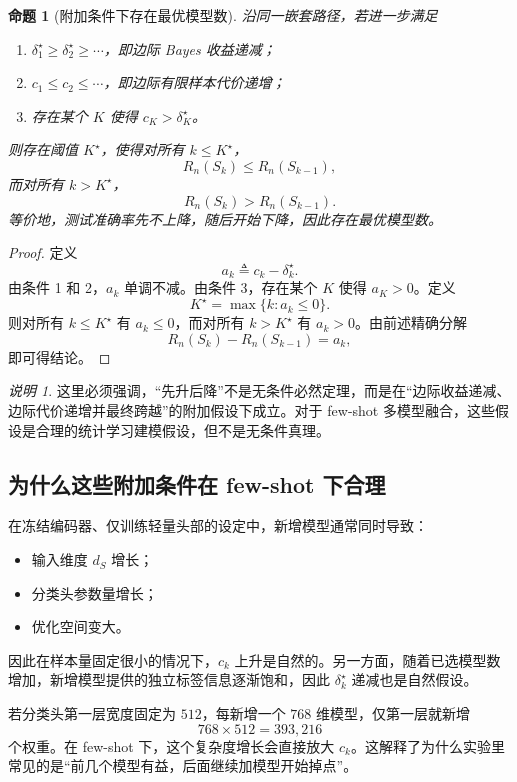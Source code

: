 \documentclass[UTF8,fontset=fandol]{ctexart}
\newtheorem{proposition}{命题}
\theoremstyle{remark}
\newtheorem{remark}{说明}
\begin{document}
\begin{proposition}[附加条件下存在最优模型数]
沿同一嵌套路径，若进一步满足
\begin{enumerate}
    \item $\delta_1^\star \ge \delta_2^\star \ge \cdots$，即边际 Bayes 收益递减；
    \item $c_1 \le c_2 \le \cdots$，即边际有限样本代价递增；
    \item 存在某个 $K$ 使得 $c_K > \delta_K^\star$。
\end{enumerate}
则存在阈值 $K^\star$，使得对所有 $k \le K^\star$，
\[
R_n(S_k) \le R_n(S_{k-1}),
\]
而对所有 $k > K^\star$，
\[
R_n(S_k) > R_n(S_{k-1}).
\]
等价地，测试准确率先不上降，随后开始下降，因此存在最优模型数。
\end{proposition}

\begin{proof}
定义
\[
a_k \triangleq c_k - \delta_k^\star.
\]
由条件 1 和 2，$a_k$ 单调不减。由条件 3，存在某个 $K$ 使得 $a_K > 0$。定义
\[
K^\star = \max \{k : a_k \le 0\}.
\]
则对所有 $k \le K^\star$ 有 $a_k \le 0$，而对所有 $k > K^\star$ 有 $a_k > 0$。由前述精确分解
\[
R_n(S_k) - R_n(S_{k-1}) = a_k,
\]
即可得结论。
\end{proof}

\begin{remark}
这里必须强调，“先升后降”不是无条件必然定理，而是在“边际收益递减、边际代价递增并最终跨越”的附加假设下成立。对于 few-shot 多模型融合，这些假设是合理的统计学习建模假设，但不是无条件真理。
\end{remark}

\subsection{为什么这些附加条件在 few-shot 下合理}

在冻结编码器、仅训练轻量头部的设定中，新增模型通常同时导致：
\begin{itemize}
    \item 输入维度 $d_S$ 增长；
    \item 分类头参数量增长；
    \item 优化空间变大。
\end{itemize}
因此在样本量固定很小的情况下，$c_k$ 上升是自然的。另一方面，随着已选模型数增加，新增模型提供的独立标签信息逐渐饱和，因此 $\delta_k^\star$ 递减也是自然假设。

若分类头第一层宽度固定为 $512$，每新增一个 $768$ 维模型，仅第一层就新增
\[
768 \times 512 = 393{,}216
\]
个权重。在 few-shot 下，这个复杂度增长会直接放大 $c_k$。这解释了为什么实验里常见的是“前几个模型有益，后面继续加模型开始掉点”。
\end{document}
